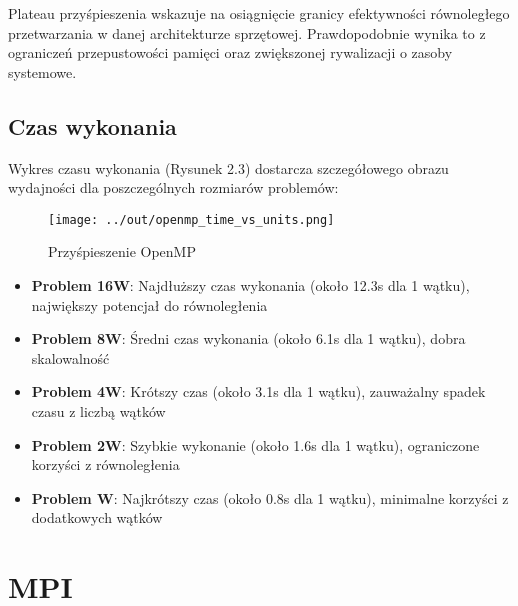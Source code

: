 \documentclass[12pt,a4paper]{report}
\begin{document}
Plateau przyśpieszenia wskazuje na osiągnięcie granicy efektywności równoległego przetwarzania w danej architekturze sprzętowej. Prawdopodobnie wynika to z ograniczeń przepustowości pamięci oraz zwiększonej rywalizacji o zasoby systemowe.

\section{Czas wykonania}

Wykres czasu wykonania (Rysunek 2.3) dostarcza szczegółowego obrazu wydajności dla poszczególnych rozmiarów problemów:

\begin{figure}[h]
    \centering
    \texttt{[image: ../out/openmp\_time\_vs\_units.png]}
    \caption{Przyśpieszenie OpenMP}
    \label{fig:etykieta}
\end{figure}

\begin{itemize}
    \item \textbf{Problem 16W}: Najdłuższy czas wykonania (około 12.3s dla 1 wątku), największy potencjał do równoległenia
    \item \textbf{Problem 8W}: Średni czas wykonania (około 6.1s dla 1 wątku), dobra skalowalność
    \item \textbf{Problem 4W}: Krótszy czas (około 3.1s dla 1 wątku), zauważalny spadek czasu z liczbą wątków
    \item \textbf{Problem 2W}: Szybkie wykonanie (około 1.6s dla 1 wątku), ograniczone korzyści z równoległenia
    \item \textbf{Problem W}: Najkrótszy czas (około 0.8s dla 1 wątku), minimalne korzyści z dodatkowych wątków
\end{itemize}

\chapter{MPI}
\end{document}
